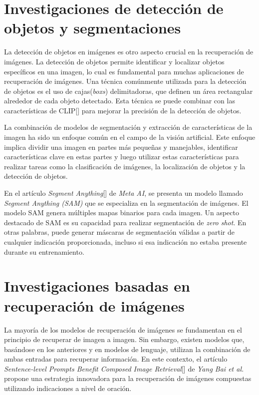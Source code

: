 \section{Investigaciones de detección de objetos y segmentaciones}

La detección de objetos en imágenes es otro aspecto crucial en la recuperación de imágenes. La detección de objetos permite identificar y localizar objetos específicos en una imagen, lo cual es fundamental para muchas aplicaciones de recuperación de imágenes. Una técnica comúnmente utilizada para la detección de objetos es el uso de cajas(\textit{boxs}) delimitadoras, que definen un área rectangular alrededor de cada objeto detectado. Esta técnica se puede combinar con las características de CLIP[\cite{clip}] para mejorar la precisión de la detección de objetos.

La combinación de modelos de segmentación y extracción de características de la imagen ha sido un enfoque común en el campo de la visión artificial. Este enfoque implica dividir una imagen en partes más pequeñas y manejables, identificar características clave en estas partes y luego utilizar estas características para realizar tareas como la clasificación de imágenes, la localización de objetos y la detección de objetos.

En el artículo \textit{Segment Anything}[\cite{sam-paper}] de \textit{Meta AI}, se presenta un modelo llamado \textit{Segment Anything (SAM)} que se especializa en la segmentación de imágenes. El modelo SAM genera múltiples mapas binarios para cada imagen. Un aspecto destacado de SAM es su capacidad para realizar segmentación de \textit{zero shot}. En otras palabras, puede generar máscaras de segmentación válidas a partir de cualquier indicación proporcionada, incluso si esa indicación no estaba presente durante su entrenamiento. 

\section{Investigaciones basadas en recuperaci\'on de im\'agenes}

La mayoría de los modelos de recuperación de imágenes se fundamentan en el principio de recuperar de imagen a imagen. Sin embargo, existen modelos que, basándose en los anteriores y en modelos de lenguaje, utilizan la combinación de ambas entradas para recuperar información. En este contexto, el artículo \textit{Sentence-level Prompts Benefit Composed Image Retrieval}[\cite{sentence-level}] de \textit{Yang Bai et al.} propone una estrategia innovadora para la recuperación de imágenes compuestas utilizando indicaciones a nivel de oración.

